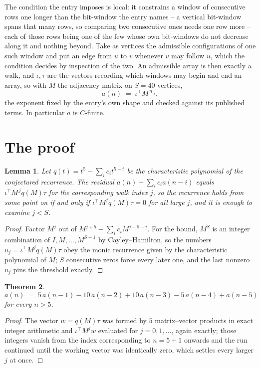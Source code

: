 \documentclass[11pt,a4paper]{article}
\theoremstyle{plain}
\newtheorem{theorem}{Theorem}
\newtheorem{lemma}[theorem]{Lemma}
\theoremstyle{definition}
\begin{document}
The condition the entry imposes is local: it constrains a window of consecutive rows one longer than the bit-window the entry names -- a vertical bit-window spans that many rows, so comparing two consecutive ones needs one row more -- each of those rows being one of the few whose own bit-windows do not decrease along it and nothing beyond. Take as vertices the admissible configurations of one such window and put an edge from $u$ to $v$ whenever $v$ may follow $u$, which the condition decides by inspection of the two.
An admissible array is then exactly a walk, and $\iota,\tau$ are the vectors recording which windows may begin and end an array, so with $M$ the adjacency matrix on $S=40$ vertices,
\[
a(n)\;=\;\iota^{\!\top}M^{\,n}\tau ,
\]
the exponent fixed by the entry's own shape and checked against its published terms. In
particular $a$ is $C$-finite.

\section{The proof}

\begin{lemma}\label{lem:crit}
Let $q(t)=t^{5}-\sum_i c_it^{5-i}$ be the characteristic polynomial of the
conjectured recurrence. The residual $a(n)-\sum_ic_ia(n-i)$ equals
$\iota^{\!\top}M^{\,j}q(M)\tau$ for the corresponding walk index $j$, so the recurrence
holds from some point on if and only if $\iota^{\!\top}M^{j}q(M)\tau=0$ for all large $j$,
and it is enough to examine $j<S$.
\end{lemma}

\begin{proof}
Factor $M^{j}$ out of $M^{j+5}-\sum_ic_iM^{j+5-i}$. For the bound, $M^{S}$
is an integer combination of $I,M,\dots,M^{S-1}$ by Cayley--Hamilton, so the numbers
$u_j=\iota^{\!\top}M^{j}q(M)\tau$ obey the monic recurrence given by the characteristic
polynomial of $M$; $S$ consecutive zeros force every later one, and the last nonzero $u_j$
pins the threshold exactly.
\end{proof}

\begin{theorem}
\[
a(n)\;=\;5\,a(n-1) - 10\,a(n-2) + 10\,a(n-3) - 5\,a(n-4) + a(n-5)
\]
for every $n>5$.
\end{theorem}

\begin{proof}
The vector $w=q(M)\tau$ was formed by $5$ matrix--vector products in exact integer
arithmetic and $\iota^{\!\top}M^{j}w$ evaluated for $j=0,1,\dots$, again exactly; those
integers vanish from the index corresponding to $n=5+1$ onwards and the run continued
until the working vector was identically zero, which settles every larger $j$ at once.
\end{proof}
\end{document}
